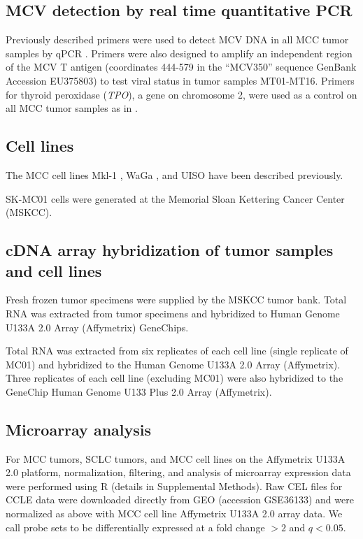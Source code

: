 \documentclass[10pt]{article}
\begin{document}
\subsection*{MCV detection by real time quantitative PCR}
Previously described primers were used to detect MCV DNA in all MCC tumor samples by qPCR \cite[personal~communication]{Garneski2008Merkel}.
Primers were also designed to amplify an independent region of the MCV T antigen (coordinates 444-579 in the ``MCV350'' sequence GenBank Accession EU375803) to test viral status in tumor samples MT01-MT16.
Primers for thyroid peroxidase (\emph{TPO}), a gene on chromosome 2, were used as a control on all MCC tumor samples as in \citep{Paulson2008ArrayCGH}.

\subsection*{Cell lines}
The MCC cell lines Mkl-1 \citep{Rosen1987Establishment}, WaGa \citep{Houben2010Merkel}, and UISO \citep{Ronan1993Merkel} have been described previously.

SK-MC01 cells were generated at the Memorial Sloan Kettering Cancer Center (MSKCC).

\subsection*{cDNA array hybridization of tumor samples and cell lines}
Fresh frozen tumor specimens were supplied by the MSKCC tumor bank.
Total RNA was extracted from tumor specimens and hybridized to Human Genome U133A 2.0 Array (Affymetrix) GeneChips.

Total RNA was extracted from six replicates of each cell line (single replicate of MC01) and hybridized to the Human Genome U133A 2.0 Array (Affymetrix).
Three replicates of each cell line (excluding MC01) were also hybridized to the GeneChip Human Genome U133 Plus 2.0 Array (Affymetrix).

\subsection*{Microarray analysis}
For MCC tumors, SCLC tumors, and MCC cell lines on the Affymetrix U133A 2.0 platform, normalization, filtering, and analysis of microarray expression data were performed using R (details in Supplemental Methods).
Raw CEL files for CCLE data were downloaded directly from GEO (accession GSE36133) and were normalized as above with MCC cell line Affymetrix U133A 2.0 array data.
We call probe sets to be differentially expressed at a fold change $> 2$ and $q < 0.05$.
\end{document}
